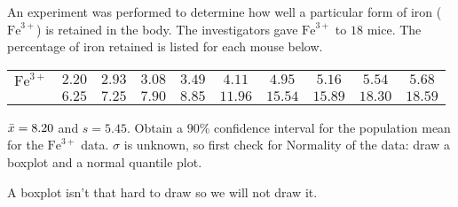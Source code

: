 \documentclass[10pt, a4paper]{article}
\begin{document}
\begin{example}
    An experiment was performed to determine how well a particular form of iron ($\text{Fe} ^ {3+}$) is retained in the body.
    The investigators gave $\text{Fe} ^ {3+}$ to $18$ mice.
    The percentage of iron retained is listed for each mouse below.
    \begin{table}[H]
        \begin{tabular}{cccccccccc}
             $\text{Fe} ^ {3+}$ & $2.20$ & $2.93$ & $3.08$ & $3.49$ & $4.11$ & $4.95$ & $5.16$ & $5.54$ & $5.68$ \\
             \phantom{} &  $6.25$ & $7.25$ & $7.90$ & $8.85$ & $11.96$ & $15.54$ & $15.89$ & $18.30$ & $18.59$
        \end{tabular}
    \end{table}

    $\Bar{x} = 8.20$ and $s = 5.45$.
    Obtain a $90\%$ confidence interval for the population mean for the $\text{Fe} ^ {3+}$ data.
    $\sigma$ is unknown,
    so first check for Normality of the data:
    draw a boxplot and a normal quantile plot.

    \begin{solution}
        A boxplot isn't that hard to draw so we will not draw it.


\end{solution}
\end{example}
\end{document}
